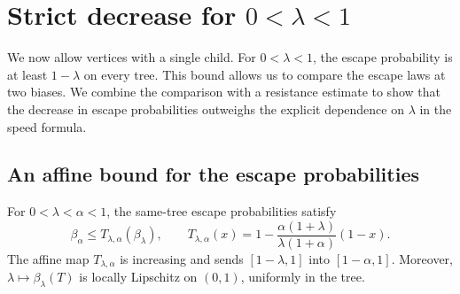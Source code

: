 \section{Strict decrease for \texorpdfstring{$0<\lambda<1$}{0 < lambda < 1}}\label{sec:low}

We now allow vertices with a single child. For $0<\lambda<1$, the escape probability is at least $1-\lambda$ on every tree. This bound allows us to compare the escape laws at two biases. We combine the comparison with a resistance estimate to show that the decrease in escape probabilities outweighs the explicit dependence on $\lambda$ in the speed formula.

\subsection{An affine bound for the escape probabilities}
\begin{lemma}\label{lem:low-transport}
For $0<\lambda<\alpha<1$, the same-tree escape probabilities satisfy
\begin{equation}\label{eq:low-transport}
 \beta_\alpha\le T_{\lambda,\alpha}(\beta_\lambda),\qquad
 T_{\lambda,\alpha}(x)
 =1-\frac{\alpha(1+\lambda)}{\lambda(1+\alpha)}(1-x).
\end{equation}
The affine map $T_{\lambda,\alpha}$ is increasing and sends $[1-\lambda,1]$ into $[1-\alpha,1]$. Moreover, $\lambda\mapsto\beta_\lambda(T)$ is locally Lipschitz on $(0,1)$, uniformly in the tree.
\end{lemma}

